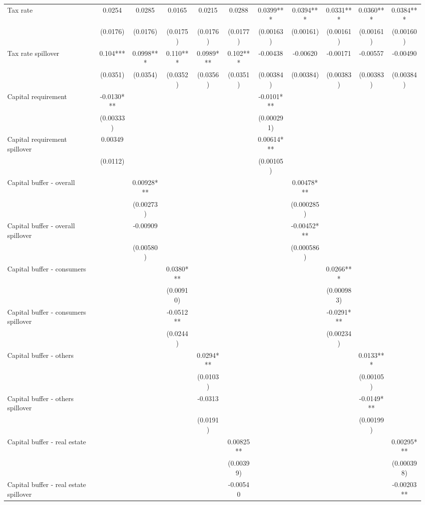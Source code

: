 \begin{tabular}{lcccccccccc}
Tax rate & 0.0254 & 0.0285 & 0.0165 & 0.0215 & 0.0288 & 0.0399*** & 0.0394*** & 0.0331*** & 0.0360*** & 0.0384*** \\
 & (0.0176) & (0.0176) & (0.0175) & (0.0176) & (0.0177) & (0.00163) & (0.00161) & (0.00161) & (0.00161) & (0.00160) \\
Tax rate spillover & 0.104*** & 0.0998*** & 0.110*** & 0.0989*** & 0.102*** & -0.00438 & -0.00620 & -0.00171 & -0.00557 & -0.00490 \\
 & (0.0351) & (0.0354) & (0.0352) & (0.0356) & (0.0351) & (0.00384) & (0.00384) & (0.00383) & (0.00383) & (0.00384) \\
Capital requirement & -0.0130*** &  &  &  &  & -0.0101*** &  &  &  &  \\
 & (0.00333) &  &  &  &  & (0.000291) &  &  &  &  \\
Capital requirement spillover & 0.00349 &  &  &  &  & 0.00614*** &  &  &  &  \\
 & (0.0112) &  &  &  &  & (0.00105) &  &  &  &  \\
Capital buffer - overall &  & 0.00928*** &  &  &  &  & 0.00478*** &  &  &  \\
 &  & (0.00273) &  &  &  &  & (0.000285) &  &  &  \\
Capital buffer - overall spillover &  & -0.00909 &  &  &  &  & -0.00452*** &  &  &  \\
 &  & (0.00580) &  &  &  &  & (0.000586) &  &  &  \\
Capital buffer - consumers &  &  & 0.0380*** &  &  &  &  & 0.0266*** &  &  \\
 &  &  & (0.00910) &  &  &  &  & (0.000983) &  &  \\
Capital buffer - consumers spillover &  &  & -0.0512** &  &  &  &  & -0.0291*** &  &  \\
 &  &  & (0.0244) &  &  &  &  & (0.00234) &  &  \\
Capital buffer - others &  &  &  & 0.0294*** &  &  &  &  & 0.0133*** &  \\
 &  &  &  & (0.0103) &  &  &  &  & (0.00105) &  \\
Capital buffer - others spillover &  &  &  & -0.0313 &  &  &  &  & -0.0149*** &  \\
 &  &  &  & (0.0191) &  &  &  &  & (0.00199) &  \\
Capital buffer - real estate &  &  &  &  & 0.00825** &  &  &  &  & 0.00295*** \\
 &  &  &  &  & (0.00399) &  &  &  &  & (0.000398) \\
Capital buffer - real estate spillover &  &  &  &  & -0.00540 &  &  &  &  & -0.00203** \\

\end{tabular}
